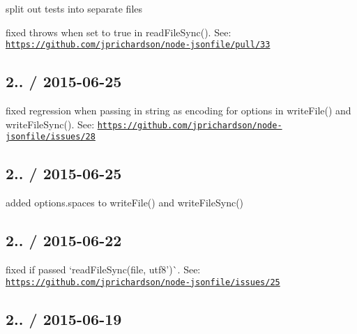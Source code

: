 \begin{DoxyItemize}
\item split out tests into separate files
\item fixed {\ttfamily throws} when set to {\ttfamily true} in {\ttfamily read\+File\+Sync()}. See\+: \href{https://github.com/jprichardson/node-jsonfile/pull/33}{\tt https\+://github.\+com/jprichardson/node-\/jsonfile/pull/33}
\end{DoxyItemize}

\subsection*{2.. / 2015-\/06-\/25 }


\begin{DoxyItemize}
\item fixed regression when passing in string as encoding for options in {\ttfamily write\+File()} and {\ttfamily write\+File\+Sync()}. See\+: \href{https://github.com/jprichardson/node-jsonfile/issues/28}{\tt https\+://github.\+com/jprichardson/node-\/jsonfile/issues/28}
\end{DoxyItemize}

\subsection*{2.. / 2015-\/06-\/25 }


\begin{DoxyItemize}
\item added {\ttfamily options.\+spaces} to {\ttfamily write\+File()} and {\ttfamily write\+File\+Sync()}
\end{DoxyItemize}

\subsection*{2.. / 2015-\/06-\/22 }


\begin{DoxyItemize}
\item fixed if passed `read\+File\+Sync(file, \textquotesingle{}utf8')\`{}. See\+: \href{https://github.com/jprichardson/node-jsonfile/issues/25}{\tt https\+://github.\+com/jprichardson/node-\/jsonfile/issues/25}
\end{DoxyItemize}

\subsection*{2.. / 2015-\/06-\/19 }


